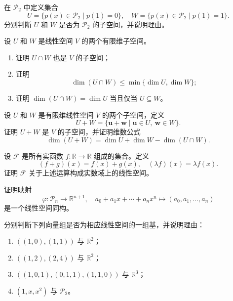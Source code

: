 \begin{exercise}
    \label{exer_vector_9}
    在 \(\mathcal P_2\) 中定义集合
    \[
        U=\{p(x)\in\mathcal P_2\mid p(1)=0\},\quad
        W=\{p(x)\in\mathcal P_2\mid p(1)=1\}.
    \]
    分别判断 \(U\) 和 \(W\) 是否为 \(\mathcal P_2\) 的子空间，并说明理由。
\end{exercise}

\begin{exercise}
    \label{exer_vector_10}
    设 \(U\) 和 \(W\) 是线性空间 \(V\) 的两个有限维子空间。
    \begin{enumerate}
        \item 证明 \(U\cap W\) 也是 \(V\) 的子空间；
        \item 证明
              \[
                  \dim(U\cap W)\leq\min\{\dim U,\dim W\};
              \]
        \item 证明 \(\dim(U\cap W)=\dim U\) 当且仅当 \(U\subseteq W\)。
    \end{enumerate}
\end{exercise}

\begin{exercise}
    \label{exer_vector_11}
    设 \(U\) 和 \(W\) 是有限维线性空间 \(V\) 的两个子空间，定义
    \[
        U+W=\{\bm u+\bm w\mid \bm u\in U,\ \bm w\in W\}.
    \]
    证明 \(U+W\) 是 \(V\) 的子空间，并证明维数公式
    \[
        \dim(U+W)=\dim U+\dim W-\dim(U\cap W).
    \]
\end{exercise}

\begin{exercise}
    \label{exer_vector_12}
    设 \(\mathcal F\) 是所有实函数 \(f:\mathbb R\to\mathbb R\) 组成的集合。定义
    \[
        (f+g)(x)=f(x)+g(x),\quad
        (\lambda f)(x)=\lambda f(x).
    \]
    证明 \(\mathcal F\) 关于上述运算构成实数域上的线性空间。
\end{exercise}

\begin{exercise}
    \label{exer_vector_13}
    证明映射
    \[
        \varphi:\mathcal P_n\to\mathbb R^{n+1},\quad
        a_0+a_1x+\cdots+a_nx^n\longmapsto(a_0,a_1,\ldots,a_n)
    \]
    是一个线性空间同构。
\end{exercise}

\begin{exercise}
    \label{exer_vector_14}
    分别判断下列向量组是否为相应线性空间的一组基，并说明理由：
    \begin{enumerate}
        \item \(((1,0),(1,1))\) 与 \(\mathbb R^2\)；
        \item \(((1,2),(2,4))\) 与 \(\mathbb R^2\)；
        \item \(((1,0,1),(0,1,1),(1,1,0))\) 与 \(\mathbb R^3\)；
        \item \((1,x,x^2)\) 与 \(\mathcal P_2\)。
    \end{enumerate}
\end{exercise}

